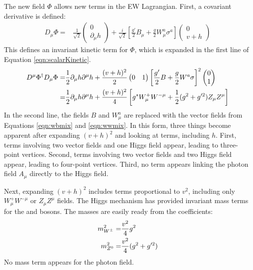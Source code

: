 The new field $\Phi$ allows new terms in the EW Lagrangian.
First, a covariant derivative is defined:
\begin{equation}\begin{split}
        D_\mu\Phi=&\frac{1}{\sqrt{2}}\begin{pmatrix}0\\\partial_\mu h\end{pmatrix}+\frac{i}{\sqrt{2}}\left[\frac{g'}{2}B_\mu+\frac{g}{2}W_\mu^a\sigma^a\right] \begin{pmatrix}0\\v+h\end{pmatrix}
\end{split}\end{equation}
This defines an invariant kinetic term for $\Phi$, which is expanded in the first line of Equation \ref{eqn:scalarKinetic}.
\begin{equation}\begin{split}\label{eqn:scalarKinetic}
    D^\mu\Phi^\dagger D_\mu\Phi =& \frac{1}{2}\partial_\mu h\partial^\mu h+\frac{(v+h)^2}{2}\begin{pmatrix}0&1\end{pmatrix}\left[\frac{g'}{2}B+\frac{g}{2}W^a\sigma\right]^2\begin{pmatrix}0\\1\end{pmatrix} \\
    =& \frac{1}{2}\partial_\mu h\partial^\mu h+\frac{(v+h)^2}{4}\left[g^sW^+_\mu W^{-\mu}+\frac{1}{2}(g^2+g'^2)Z_\mu Z^\mu\right] \\
\end{split}\end{equation}
In the second line, the fields $B$ and $W_\mu^a$ are replaced with the vector fields from Equations \ref{eqn:wbmix} and \ref{eqn:wwmix}.
In this form, three things become apparent after expanding $(v+h)^2$ and looking at terms, including $h$.
First, terms involving two vector fields and one Higgs field appear, leading to three-point vertices.
Second, terms involving two vector fields and two Higgs field appear, leading to four-point vertices.
Third, no term appears linking the photon field $A_\mu$ directly to the Higgs field.

Next, expanding $(v+h)^2$ includes terms proportional to $v^2$, including only $W^+_\mu W^{-\mu}$ or $Z_\mu Z^\mu$ fields.
The Higgs mechanism has provided invariant mass terms for the \Z and \W bosons.
The masses are easily ready from the coefficients:
\begin{equation}\begin{split}
m_{W^\pm}^2=&\frac{v^2}{4}g^2 \\
m_{Z^0}^2=&\frac{v^2}{4}(g^2+g'^2) \\
\end{split}\end{equation}
No mass term appears for the photon field.

